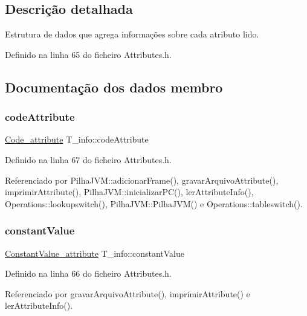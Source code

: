 \subsection{Descrição detalhada}
Estrutura de dados que agrega informações sobre cada atributo lido. 

Definido na linha 65 do ficheiro Attributes.\+h.



\subsection{Documentação dos dados membro}
\mbox{\label{unionT__info_a6924ca9d9e6afa44575f8a642d3b5612}} 
\subsubsection{\texorpdfstring{code\+Attribute}{codeAttribute}}
{\footnotesize\ttfamily \hyperlink{structCode__attribute}{Code\+\_\+attribute} T\+\_\+info\+::code\+Attribute}



Definido na linha 67 do ficheiro Attributes.\+h.



Referenciado por Pilha\+J\+V\+M\+::adicionar\+Frame(), gravar\+Arquivo\+Attribute(), imprimir\+Attribute(), Pilha\+J\+V\+M\+::inicializar\+P\+C(), ler\+Attribute\+Info(), Operations\+::lookupswitch(), Pilha\+J\+V\+M\+::\+Pilha\+J\+V\+M() e Operations\+::tableswitch().

\mbox{\label{unionT__info_a523d69820ae3ef82c4e3bbfeb6fc3b84}} 
\subsubsection{\texorpdfstring{constant\+Value}{constantValue}}
{\footnotesize\ttfamily \hyperlink{structConstantValue__attribute}{Constant\+Value\+\_\+attribute} T\+\_\+info\+::constant\+Value}



Definido na linha 66 do ficheiro Attributes.\+h.



Referenciado por gravar\+Arquivo\+Attribute(), imprimir\+Attribute() e ler\+Attribute\+Info().

